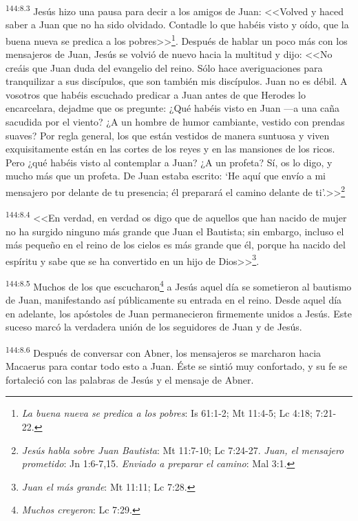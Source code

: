 \par 
\textsuperscript{144:8.3} Jesús hizo una pausa para decir a los amigos de Juan: <<Volved y haced saber a Juan que no ha sido olvidado. Contadle lo que habéis visto y oído, que la buena nueva se predica a los pobres>>\footnote{\textit{La buena nueva se predica a los pobres}: Is 61:1-2; Mt 11:4-5; Lc 4:18; 7:21-22.}. Después de hablar un poco más con los mensajeros de Juan, Jesús se volvió de nuevo hacia la multitud y dijo: <<No creáis que Juan duda del evangelio del reino. Sólo hace averiguaciones para tranquilizar a sus discípulos, que son también mis discípulos. Juan no es débil. A vosotros que habéis escuchado predicar a Juan antes de que Herodes lo encarcelara, dejadme que os pregunte: ¿Qué habéis visto en Juan ---a una caña sacudida por el viento? ¿A un hombre de humor cambiante, vestido con prendas suaves? Por regla general, los que están vestidos de manera suntuosa y viven exquisitamente están en las cortes de los reyes y en las mansiones de los ricos. Pero ¿qué habéis visto al contemplar a Juan? ¿A un profeta? Sí, os lo digo, y mucho más que un profeta. De Juan estaba escrito: `He aquí que envío a mi mensajero por delante de tu presencia; él preparará el camino delante de ti'.>>\footnote{\textit{Jesús habla sobre Juan Bautista}: Mt 11:7-10; Lc 7:24-27. \textit{Juan, el mensajero prometido}: Jn 1:6-7,15. \textit{Enviado a preparar el camino}: Mal 3:1.}

\par 
\textsuperscript{144:8.4} <<En verdad, en verdad os digo que de aquellos que han nacido de mujer no ha surgido ninguno más grande que Juan el Bautista; sin embargo, incluso el más pequeño en el reino de los cielos es más grande que él, porque ha nacido del espíritu y sabe que se ha convertido en un hijo de Dios>>\footnote{\textit{Juan el más grande}: Mt 11:11; Lc 7:28.}.

\par 
\textsuperscript{144:8.5} Muchos de los que escucharon\footnote{\textit{Muchos creyeron}: Lc 7:29.} a Jesús aquel día se sometieron al bautismo de Juan, manifestando así públicamente su entrada en el reino. Desde aquel día en adelante, los apóstoles de Juan permanecieron firmemente unidos a Jesús. Este suceso marcó la verdadera unión de los seguidores de Juan y de Jesús.

\par 
\textsuperscript{144:8.6} Después de conversar con Abner, los mensajeros se marcharon hacia Macaerus para contar todo esto a Juan. Éste se sintió muy confortado, y su fe se fortaleció con las palabras de Jesús y el mensaje de Abner.

